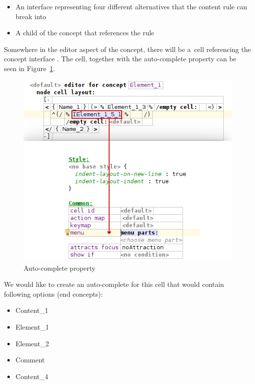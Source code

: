 \begin{itemize}
	\item An interface  representing four different alternatives that the content rule can break into

	\item A child of the  concept that references the  rule
\end{itemize}

Somewhere in the editor aspect of the  concept, there will be a~cell referencing the concept interface .
The cell, together with the auto-complete property can be seen in Figure~\ref{fig:autocomplete_cell}.
\\

\begin{figure}[ht]
	\centering
	\includegraphics[scale=0.72]{./img/autocomplete_cell.png}
	\caption{Auto-complete property}
	\label{fig:autocomplete_cell}
\end{figure}

We would like to create an auto-complete for this cell that would contain following options (end concepts):

\begin{itemize}
	\itemsep0em
	\item Content{\_}1
	\item Element{\_}1
	\item Element{\_}2
	\item Comment
	\item Content{\_}4
\end{itemize}

